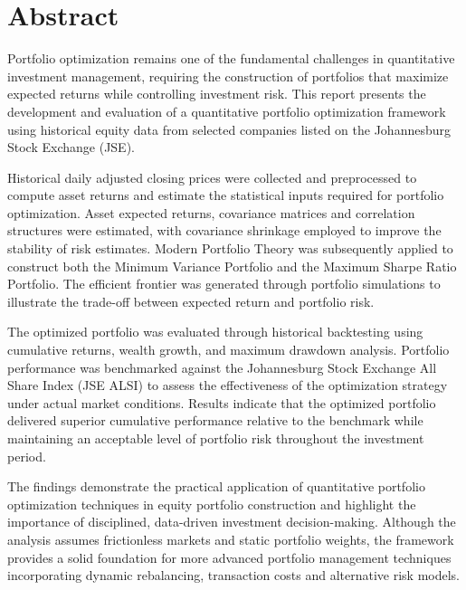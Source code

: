 \section{Abstract}

Portfolio optimization remains one of the fundamental challenges in quantitative investment management, requiring the construction of portfolios that maximize expected returns while controlling investment risk. This report presents the development and evaluation of a quantitative portfolio optimization framework using historical equity data from selected companies listed on the Johannesburg Stock Exchange (JSE).

Historical daily adjusted closing prices were collected and preprocessed to compute asset returns and estimate the statistical inputs required for portfolio optimization. Asset expected returns, covariance matrices and correlation structures were estimated, with covariance shrinkage employed to improve the stability of risk estimates. Modern Portfolio Theory was subsequently applied to construct both the Minimum Variance Portfolio and the Maximum Sharpe Ratio Portfolio. The efficient frontier was generated through portfolio simulations to illustrate the trade-off between expected return and portfolio risk.

The optimized portfolio was evaluated through historical backtesting using cumulative returns, wealth growth, and maximum drawdown analysis. Portfolio performance was benchmarked against the Johannesburg Stock Exchange All Share Index (JSE ALSI) to assess the effectiveness of the optimization strategy under actual market conditions. Results indicate that the optimized portfolio delivered superior cumulative performance relative to the benchmark while maintaining an acceptable level of portfolio risk throughout the investment period.

The findings demonstrate the practical application of quantitative portfolio optimization techniques in equity portfolio construction and highlight the importance of disciplined, data-driven investment decision-making. Although the analysis assumes frictionless markets and static portfolio weights, the framework provides a solid foundation for more advanced portfolio management techniques incorporating dynamic rebalancing, transaction costs and alternative risk models.

\vspace{1cm}

\clearpage